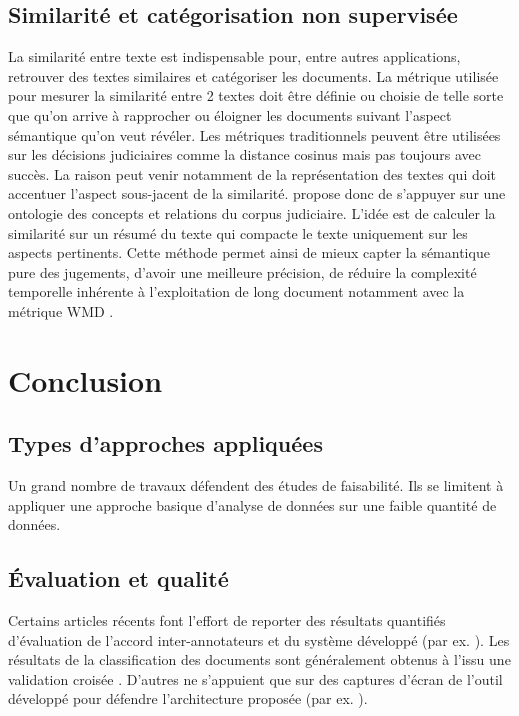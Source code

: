 \subsection{Similarité et catégorisation non supervisée}

La similarité entre texte est indispensable pour, entre autres applications, retrouver des textes similaires et catégoriser les documents. La métrique utilisée pour mesurer la similarité entre 2 textes doit être définie ou choisie de telle sorte que qu'on arrive à rapprocher ou éloigner les documents suivant l'aspect sémantique qu'on veut révéler. Les métriques traditionnels peuvent être utilisées sur les décisions judiciaires comme la distance cosinus \citep{thenmozhi2017legalprecedretriev} mais pas toujours avec succès. La raison peut venir notamment de la représentation des textes qui doit accentuer l'aspect sous-jacent de la similarité. \citet{ma2018wmdchinesecase} propose donc de s'appuyer sur une ontologie des concepts et relations du corpus judiciaire. L'idée est de calculer la similarité sur un résumé du texte qui compacte le texte uniquement sur les aspects pertinents. Cette méthode permet ainsi de mieux capter la sémantique pure des jugements, d'avoir une meilleure précision, de réduire la complexité temporelle inhérente à l'exploitation de long document notamment avec la métrique WMD \citep{kusner2015wordmoverdist}.

\section{Conclusion}
\label{sec:literature:conclusion}
\subsection{Types d'approches appliquées}
Un grand nombre de travaux défendent des études de faisabilité. Ils se limitent à appliquer une approche basique d'analyse de données sur une faible quantité de données.


\subsection{Évaluation et qualité}
 Certains articles récents font l'effort de reporter des résultats quantifiés d'évaluation de l'accord inter-annotateurs et du système développé (par ex. \citep{Shulayeva2017recognfactprincip}). Les résultats de la classification des documents sont généralement obtenus à l'issu une validation croisée \cite{Sulea2017predictareadecision,sulea2017legalEnsSVM,Aletras2016predictDecisionECHR}. D'autres ne s'appuient que sur des captures d'écran de l'outil développé pour défendre l'architecture proposée (par ex. \citep{wyner2010extractlegalelts,Waltl2016lexia}).


